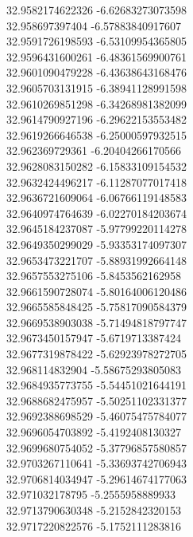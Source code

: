 {32.9582174622326	-6.62683273073598\\
32.958697397404	-6.57883840917607\\
32.9591726198593	-6.53109954365805\\
32.9596431600261	-6.48361569900761\\
32.9601090479228	-6.43638643168476\\
32.9605703131915	-6.38941128991598\\
32.9610269851298	-6.34268981382099\\
32.9614790927196	-6.29622153553482\\
32.9619266646538	-6.25000597932515\\
32.962369729361	-6.20404266170566\\
32.9628083150282	-6.15833109154532\\
32.9632424496217	-6.11287077017418\\
32.9636721609064	-6.06766119148583\\
32.9640974764639	-6.02270184203674\\
32.9645184237087	-5.97799220114278\\
32.9649350299029	-5.93353174097307\\
32.9653473221707	-5.88931992664148\\
32.9657553275106	-5.8453562162958\\
32.9661590728074	-5.80164006120486\\
32.9665585848425	-5.75817090584379\\
32.9669538903038	-5.71494818797747\\
32.9673450157947	-5.6719713387424\\
32.9677319878422	-5.62923978272705\\
32.968114832904	-5.58675293805083\\
32.9684935773755	-5.54451021644191\\
32.9688682475957	-5.50251102331377\\
32.9692388698529	-5.46075475784077\\
32.9696054703892	-5.4192408130327\\
32.9699680754052	-5.37796857580857\\
32.9703267110641	-5.33693742706943\\
32.9706814034947	-5.29614674177063\\
32.971032178795	-5.2555958889933\\
32.9713790630348	-5.2152842320153\\
32.9717220822576	-5.1752111283816\\
}
